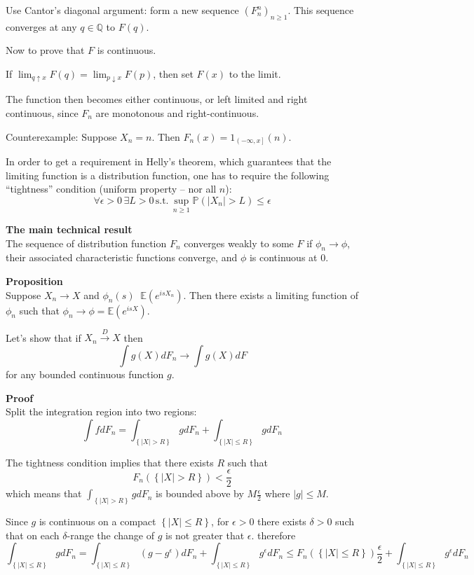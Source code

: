 \documentclass[a4paper]{article}
\newcommand{\obj}[1]{{\left\{ #1 \right \}}}
\newcommand{\ploc}[1]{{\left ( #1 \right ]}}
\newcommand{\brac}[1]{{\left ( #1 \right )}}
\newcommand{\abs}[1]{{\left | #1 \right |}}
\newcommand{\Ex}{\mathbb{E}}
\newcommand{\pr}{\mathbb{P}}
\newcommand{\defn}{\mathop{\overset{\Delta}{=}}\nolimits}
\begin{document}
Use Cantor's diagonal argument: form a new sequence $\brac{F^n_n}_{n\geq1}$. This sequence converges at any $q\in\mathbb{Q}$ to $F(q)$.

Now to prove that $F$ is continuous.

If $\lim_{q\uparrow x}F(q) = \lim_{p\downarrow x}F(p)$, then set $F(x)$ to the limit.

The function then becomes either continuous, or left limited and right continuous, since $F_n$ are monotonous and right-continuous.

Counterexample:
Suppose $X_n=n$. Then $F_n(x) = 1_{\ploc{-\infty, x}}(n)$.

In order to get a requirement in Helly's theorem, which guarantees that the limiting function is a distribution function, one has to require the following ``tightness'' condition (uniform property -- nor all $n$):
\[\forall \epsilon>0\,\exists L>0\,\text{s.t.}\,\sup_{n\geq1}\pr\brac{\abs{X_n}>L}\leq \epsilon\]



\noindent \textbf{The main technical result}\hfill\\

The sequence of distribution function $F_n$ converges weakly to some $F$ if $\phi_n\to \phi$, their associated characteristic functions converge, and $\phi$ is continuous at $0$.

\noindent \textbf{Proposition}\hfill\\

Suppose $X_n\to X$ and $\phi_n(s)\defn \Ex\brac{e^{isX_n}}$. Then there exists a limiting function of $\phi_n$ such that $\phi_n\to \phi = \Ex\brac{e^{isX}}$.

Let's show that if $X_n\overset{D}{\to} X$ then
\[\int g(X) dF_n \to \int g(X)dF\]
for any bounded continuous function $g$.

\textbf{Proof}\hfill\\
Split the integration region into two regions:
\[\int f dF_n = \int_\obj{\abs{X}>R} g dF_n + \int_\obj{\abs{X}\leq R} g dF_n\]

The tightness condition implies that there exists $R$ such that
\[F_n\brac{\obj{\abs{X}>R}}< \frac{\epsilon}{2}\]
which means that $\int_\obj{\abs{X}>R} g dF_n$ is bounded above by $M\frac{\epsilon}{2}$ where $\abs{g}\leq M$.

Since $g$ is continuous on a compact $\obj{\abs{X}\leq R}$, for $\epsilon>0$ there exists $\delta>0$ such that on each $\delta$-range the change of $g$ is not greater that $\epsilon$.
therefore 
\[\int_\obj{\abs{X}\leq R} g dF_n = \int_\obj{\abs{X}\leq R} (g-g^\epsilon) dF_n + \int_\obj{\abs{X}\leq R} g^\epsilon dF_n \leq F_n\brac{\obj{\abs{X}\leq R}}\frac{\epsilon}{2} + \int_\obj{\abs{X}\leq R} g^\epsilon dF_n\]
\end{document}
